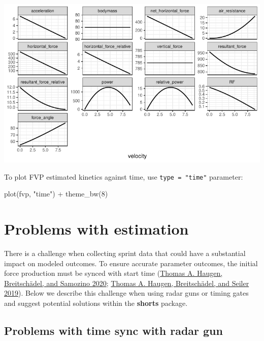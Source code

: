 \documentclass[fleqn,10pt]{wlpeerj} %
\newenvironment{Shaded}{\begin{snugshade}}{\end{snugshade}}
\newcommand{\DecValTok}[1]{\textcolor[rgb]{0.00,0.00,0.81}{#1}}
\newcommand{\FunctionTok}[1]{\textcolor[rgb]{0.00,0.00,0.00}{#1}}
\newcommand{\NormalTok}[1]{#1}
\newcommand{\SpecialCharTok}[1]{\textcolor[rgb]{0.00,0.00,0.00}{#1}}
\newcommand{\StringTok}[1]{\textcolor[rgb]{0.31,0.60,0.02}{#1}}
\begin{document}
\begin{center}\includegraphics[width=0.9\linewidth]{paper_files/figure-latex/unnamed-chunk-17-1} \end{center}

\normalsize

To plot FVP estimated kinetics against time, use \texttt{type\ =\ "time"} parameter:

\small

\begin{Shaded}
\begin{Highlighting}[]
\FunctionTok{plot}\NormalTok{(fvp, }\StringTok{"time"}\NormalTok{) }\SpecialCharTok{+} \FunctionTok{theme\_bw}\NormalTok{(}\DecValTok{8}\NormalTok{)}
\end{Highlighting}
\end{Shaded}

\normalsize

\hypertarget{problems-with-estimation}{%
\section{Problems with estimation}\label{problems-with-estimation}}

There is a challenge when collecting sprint data that could have a substantial impact on modeled outcomes. To ensure accurate parameter outcomes, the initial force production must be synced with start time (\protect\hyperlink{ref-haugenPowerForceVelocityProfilingSprinting2020}{Thomas A. Haugen, Breitschädel, and Samozino 2020}; \protect\hyperlink{ref-haugenSprintMechanicalVariables2019}{Thomas A. Haugen, Breitschädel, and Seiler 2019}). Below we describe this challenge when using radar guns or timing gates and suggest potential solutions within the \textbf{shorts} package.

\hypertarget{problems-with-time-sync-with-radar-gun}{%
\subsection{Problems with time sync with radar gun}\label{problems-with-time-sync-with-radar-gun}}
\end{document}

